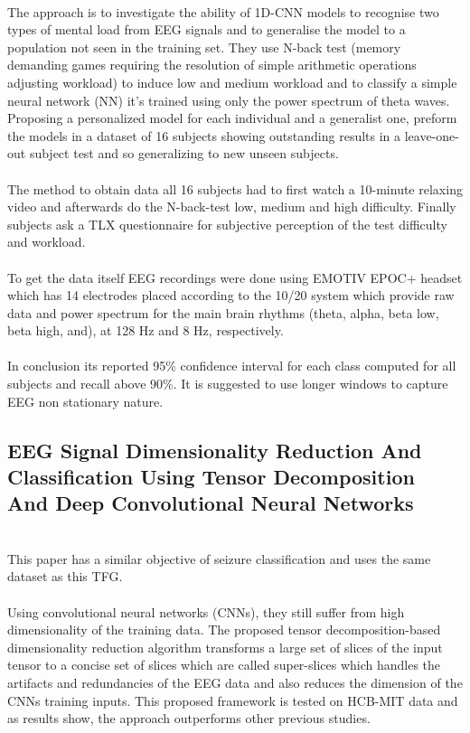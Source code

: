 \leavevmode\\
The approach is to investigate the ability of 1D-CNN models to recognise two types of mental load from EEG signals and to generalise the model to a population not seen in the training set. They use N-back test (memory demanding games requiring the resolution of simple arithmetic operations adjusting workload) to induce low and medium workload and to classify a simple neural network (NN) it’s trained using only the power spectrum of theta waves. Proposing a personalized model for each individual and a generalist one, preform the models in a dataset of 16 subjects showing outstanding results in a leave-one-out subject test and so generalizing to new unseen subjects.
\\\\
The method to obtain data all 16 subjects had to first watch a 10-minute relaxing video and afterwards do the N-back-test low, medium and high difficulty. Finally subjects ask a TLX questionnaire for subjective perception of the test difficulty and workload.
\\\\
To get the data itself EEG recordings were done using EMOTIV EPOC+ headset which has 14 electrodes placed according to the 10/20 system which provide raw data and power spectrum for the main brain rhythms (theta, alpha, beta low, beta high, and), at 128 Hz and 8 Hz, respectively. 
\\\\
In conclusion its reported 95\% confidence interval for each class computed for all subjects and recall above 90\%. It is suggested to use longer windows to capture EEG non stationary nature.
\leavevmode\\


\subsection{EEG Signal Dimensionality Reduction And Classification Using Tensor Decomposition And Deep Convolutional Neural Networks}
\leavevmode\\
This paper has a similar objective of seizure classification and uses the same dataset as this TFG.
\\\\
Using convolutional neural networks (CNNs), they still suffer from high dimensionality of the training data. The proposed tensor decomposition-based dimensionality reduction algorithm transforms a large set of slices of the input tensor to a concise set of slices which are called super-slices which handles the artifacts and redundancies of the EEG data and also reduces the dimension of the CNNs training inputs. This proposed framework is tested on HCB-MIT data and as results show, the approach outperforms other previous studies.
\\

